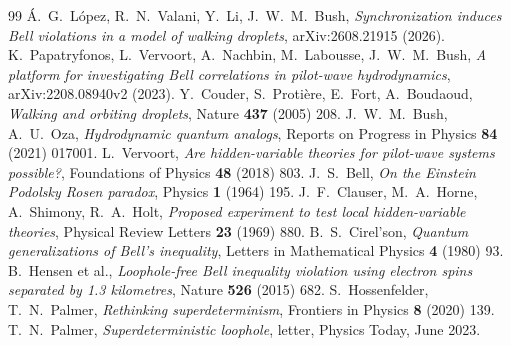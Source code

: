 \begingroup\renewcommand{\chapter}[2]{}\small
\begin{thebibliography}{99}
 Á.~G.~López, R.~N.~Valani, Y.~Li, J.~W.~M.~Bush, \textit{Synchronization induces Bell violations in a model of walking droplets}, arXiv:2608.21915 (2026).
 K.~Papatryfonos, L.~Vervoort, A.~Nachbin, M.~Labousse, J.~W.~M.~Bush, \textit{A platform for investigating Bell correlations in pilot-wave hydrodynamics}, arXiv:2208.08940v2 (2023).
 Y.~Couder, S.~Protière, E.~Fort, A.~Boudaoud, \textit{Walking and orbiting droplets}, Nature \textbf{437} (2005) 208.
 J.~W.~M.~Bush, A.~U.~Oza, \textit{Hydrodynamic quantum analogs}, Reports on Progress in Physics \textbf{84} (2021) 017001.
 L.~Vervoort, \textit{Are hidden-variable theories for pilot-wave systems possible?}, Foundations of Physics \textbf{48} (2018) 803.
 J.~S.~Bell, \textit{On the Einstein Podolsky Rosen paradox}, Physics \textbf{1} (1964) 195.
 J.~F.~Clauser, M.~A.~Horne, A.~Shimony, R.~A.~Holt, \textit{Proposed experiment to test local hidden-variable theories}, Physical Review Letters \textbf{23} (1969) 880.
 B.~S.~Cirel'son, \textit{Quantum generalizations of Bell's inequality}, Letters in Mathematical Physics \textbf{4} (1980) 93.
 B.~Hensen et al., \textit{Loophole-free Bell inequality violation using electron spins separated by 1.3 kilometres}, Nature \textbf{526} (2015) 682.
 S.~Hossenfelder, T.~N.~Palmer, \textit{Rethinking superdeterminism}, Frontiers in Physics \textbf{8} (2020) 139.
 T.~N.~Palmer, \textit{Superdeterministic loophole}, letter, Physics Today, June 2023.
\end{thebibliography}
\endgroup
